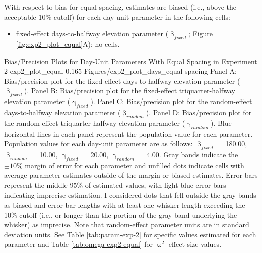 \documentclass[
12pt, %
twoside,
english]{guelphthesis}
\begin{document}
With respect to bias for equal spacing, estimates are biased (i.e., above the acceptable 10\% cutoff) for each day-unit parameter in the following cells:
\begin{itemize}
\tightlist
\item
  fixed-effect days-to-halfway elevation parameter (\(\upbeta_{fixed}\); Figure \ref{fig:exp2_plot_equal}A): no cells.
\end{itemize}
\begin{apaFigure}
[portrait]
[samepage]
[-0.2cm]
{Bias/Precision Plots for Day-Unit Parameters With Equal Spacing in Experiment 2}
{exp2_plot_equal}
{0.165}
{Figures/exp2_plot_days_equal spacing}
{Panel A: Bias/precision plot for the fixed-effect days-to-halfway elevation parameter ($\upbeta_{fixed}$). Panel B: Bias/precision plot for the fixed-effect triquarter-halfway elevation parameter ($\upgamma_{fixed}$). Panel C: Bias/precision plot for the random-effect days-to-halfway elevation parameter ($\upbeta_{random}$). Panel D: Bias/precision plot for the random-effect triquarter-halfway elevation parameter ($\upgamma_{random}$). Blue horizontal lines in each panel represent the population value for each parameter. Population values for each day-unit parameter are as follows: $\upbeta_{fixed}$ = 180.00, $\upbeta_{random}$ = 10.00, $\upgamma_{fixed}$ = 20.00, $\upgamma_{random}$ = 4.00. Gray bands indicate the $\pm 10\%$ margin of error for each parameter and unfilled dots indicate cells with average parameter estimates outside of the margin or biased estimates. Error bars represent the middle 95\% of estimated values, with light blue error bars indicating imprecise estimation. I considered dots that fell outside the gray bands as biased and error bar lengths with at least one whisker length exceeding the 10\% cutoff (i.e., or longer than the portion of the gray band underlying the whisker) as imprecise. Note that random-effect parameter units are in standard deviation units. See Table \ref{tab:param-exp-2} for specific values estimated for each parameter and Table \ref{tab:omega-exp2-equal} for $\upomega^2$ effect size values.}
\end{apaFigure}
\end{document}

